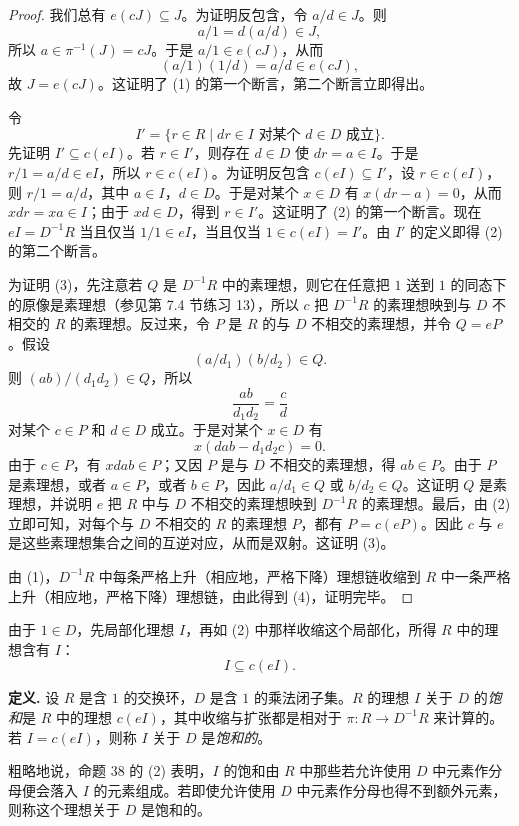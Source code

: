 \begin{proof}
	我们总有 $e(cJ)\subseteq J$。为证明反包含，令 $a/d\in J$。则
	\[
	a/1=d(a/d)\in J,
	\]
	所以 $a\in\pi^{-1}(J)=cJ$。于是 $a/1\in e(cJ)$，从而
	\[
	(a/1)(1/d)=a/d\in e(cJ),
	\]
	故 $J=e(cJ)$。这证明了 (1) 的第一个断言，第二个断言立即得出。
	
	令
	\[
	I'=\{r\in R\mid dr\in I\text{ 对某个 }d\in D\text{ 成立}\}.
	\]
	先证明 $I'\subseteq c(eI)$。若 $r\in I'$，则存在 $d\in D$ 使 $dr=a\in I$。于是 $r/1=a/d\in eI$，所以 $r\in c(eI)$。为证明反包含 $c(eI)\subseteq I'$，设 $r\in c(eI)$，则 $r/1=a/d$，其中 $a\in I$，$d\in D$。于是对某个 $x\in D$ 有 $x(dr-a)=0$，从而 $xdr=xa\in I$；由于 $xd\in D$，得到 $r\in I'$。这证明了 (2) 的第一个断言。现在 $eI=D^{-1}R$ 当且仅当 $1/1\in eI$，当且仅当 $1\in c(eI)=I'$。由 $I'$ 的定义即得 (2) 的第二个断言。
	
	为证明 (3)，先注意若 $Q$ 是 $D^{-1}R$ 中的素理想，则它在任意把 $1$ 送到 $1$ 的同态下的原像是素理想（参见第 7.4 节练习 13），所以 $c$ 把 $D^{-1}R$ 的素理想映到与 $D$ 不相交的 $R$ 的素理想。反过来，令 $P$ 是 $R$ 的与 $D$ 不相交的素理想，并令 $Q=eP$。假设
	\[
	(a/d_1)(b/d_2)\in Q.
	\]
	则 $(ab)/(d_1d_2)\in Q$，所以
	\[
	\frac{ab}{d_1d_2}=\frac{c}{d}
	\]
	对某个 $c\in P$ 和 $d\in D$ 成立。于是对某个 $x\in D$ 有
	\[
	x(dab-d_1d_2c)=0.
	\]
	由于 $c\in P$，有 $xdab\in P$；又因 $P$ 是与 $D$ 不相交的素理想，得 $ab\in P$。由于 $P$ 是素理想，或者 $a\in P$，或者 $b\in P$，因此 $a/d_1\in Q$ 或 $b/d_2\in Q$。这证明 $Q$ 是素理想，并说明 $e$ 把 $R$ 中与 $D$ 不相交的素理想映到 $D^{-1}R$ 的素理想。最后，由 (2) 立即可知，对每个与 $D$ 不相交的 $R$ 的素理想 $P$，都有 $P=c(eP)$。因此 $c$ 与 $e$ 是这些素理想集合之间的互逆对应，从而是双射。这证明 (3)。
	
	由 (1)，$D^{-1}R$ 中每条严格上升（相应地，严格下降）理想链收缩到 $R$ 中一条严格上升（相应地，严格下降）理想链，由此得到 (4)，证明完毕。
\end{proof}

由于 $1\in D$，先局部化理想 $I$，再如 (2) 中那样收缩这个局部化，所得 $R$ 中的理想含有 $I$：
\[
I\subseteq c(eI).
\]

\noindent\textbf{定义.} 设 $R$ 是含 $1$ 的交换环，$D$ 是含 $1$ 的乘法闭子集。$R$ 的理想 $I$ 关于 $D$ 的\emph{饱和}是 $R$ 中的理想 $c(eI)$，其中收缩与扩张都是相对于 $\pi:R\to D^{-1}R$ 来计算的。若 $I=c(eI)$，则称 $I$ 关于 $D$ 是\emph{饱和的}。

粗略地说，命题 38 的 (2) 表明，$I$ 的饱和由 $R$ 中那些若允许使用 $D$ 中元素作分母便会落入 $I$ 的元素组成。若即使允许使用 $D$ 中元素作分母也得不到额外元素，则称这个理想关于 $D$ 是饱和的。

